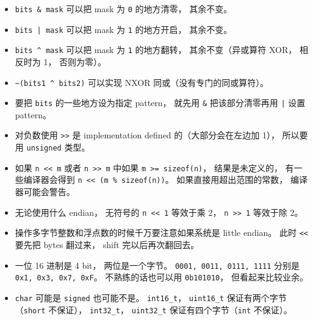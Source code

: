 
\begin{issues}
\issueDraft
\end{issues}

\begin{itemize}
\item \verb|bits & mask| 可以把 mask 为 \verb|0| 的地方清零， 其余不变。
\item \verb`bits | mask` 可以把 mask 为 \verb|1| 的地方开启， 其余不变。
\item \verb|bits ^ mask| 可以把 mask 为 \verb|1| 的地方翻转， 其余不变（异或算符 XOR， 相反时为 1， 否则为零）。
\item \verb|~(bits1 ^ bits2)| 可以实现 NXOR 同或（没有专门的同或算符）。
\item 要把 \verb|bits| 的一些地方设为指定 pattern， 就先用 \verb|&| 把该部分清零再用 \verb`|` 设置 pattern。
\item 对负数使用 \verb|>>| 是 implementation defined 的（大部分会在左边加 1）， 所以要用 \verb|unsigned| 类型。
\item 如果 \verb|n << m| 或者 \verb|n >> m| 中如果 \verb|m >= sizeof(n)|， 结果是未定义的， 有一些编译器会得到 \verb|n << (m % sizeof(n))|。 如果直接用超出范围的常数， 编译器可能会警告。
\item 无论使用什么 endian， 无符号的 \verb|n << 1| 等效于乘 2， \verb|n >> 1| 等效于除 2。
\item 操作多字节整数和浮点数的时候千万要注意如果系统是 little endian。 此时 \verb|<<| 要先把 bytes 翻过来， shift 完以后再次翻回去。
\item 一位 16 进制是 4 bit， 两位是一个字节。 \verb|0001, 0011, 0111, 1111| 分别是 \verb|0x1, 0x3, 0x7, 0xF|。 不熟练的话也可以用 \verb|0b101010|， 但看起来比较业余。
\item \verb|char| 可能是 \verb|signed| 也可能不是。 \verb|int16_t|， \verb|uint16_t| 保证有两个字节（\verb|short| 不保证）， \verb|int32_t|， \verb|uint32_t| 保证有四个字节（\verb|int| 不保证）。
\end{itemize}
